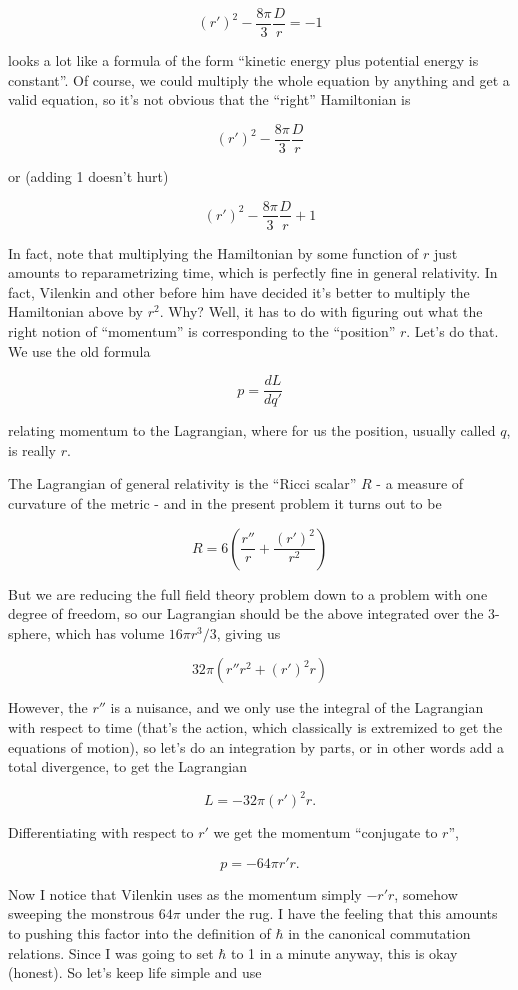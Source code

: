 \documentclass{article}
\begin{document}
\[(r')^2 - \frac{8\pi}{3} \frac{D}{r} = - 1 \tag{3}\]

looks a lot like a formula of the form ``kinetic energy plus potential
energy is constant''. Of course, we could multiply the whole equation by
anything and get a valid equation, so it's not obvious that the
``right'' Hamiltonian is

\[(r')^2 - \frac{8\pi}{3} \frac{D}{r}\]

or (adding 1 doesn't hurt)

\[(r')^2 - \frac{8\pi}{3} \frac{D}{r} + 1\]

In fact, note that multiplying the Hamiltonian by some function of \(r\)
just amounts to reparametrizing time, which is perfectly fine in general
relativity. In fact, Vilenkin and other before him have decided it's
better to multiply the Hamiltonian above by \(r^2\). Why? Well, it has
to do with figuring out what the right notion of ``momentum'' is
corresponding to the ``position'' \(r\). Let's do that. We use the old
formula

\[p = \frac{dL}{dq'}\]

relating momentum to the Lagrangian, where for us the position, usually
called \(q\), is really \(r\).

The Lagrangian of general relativity is the ``Ricci scalar'' \(R\) - a
measure of curvature of the metric - and in the present problem it turns
out to be

\[R = 6 \left(\frac{r''}{r} + \frac{(r')^2}{r^2}\right)\]

But we are reducing the full field theory problem down to a problem with
one degree of freedom, so our Lagrangian should be the above integrated
over the 3-sphere, which has volume \(16 \pi r^3/3\), giving us

\[32\pi (r''r^2 + (r')^2 r)\]

However, the \(r''\) is a nuisance, and we only use the integral of the
Lagrangian with respect to time (that's the action, which classically is
extremized to get the equations of motion), so let's do an integration
by parts, or in other words add a total divergence, to get the
Lagrangian

\[L = -32\pi (r')^2 r.\]

Differentiating with respect to \(r'\) we get the momentum ``conjugate
to \(r\)'',

\[p = -64\pi r'r.\]

Now I notice that Vilenkin uses as the momentum simply \(-r'r\), somehow
sweeping the monstrous \(64\pi\) under the rug. I have the feeling that
this amounts to pushing this factor into the definition of \(\hbar\) in
the canonical commutation relations. Since I was going to set \(\hbar\)
to 1 in a minute anyway, this is okay (honest). So let's keep life
simple and use
\end{document}
